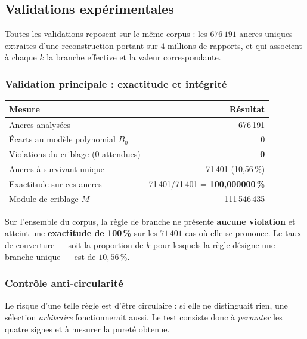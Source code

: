 \documentclass[11pt,a4paper]{article}
\begin{document}
\subsection{Validations expérimentales}

Toutes les validations reposent sur le même corpus : les
$676\,191$ ancres uniques extraites d'une reconstruction portant sur
$4$ millions de rapports, et qui associent à chaque $k$ la branche
effective et la valeur correspondante.

\subsubsection{Validation principale : exactitude et intégrité}

\begin{center}
\small
\begin{tabular}{@{}l r@{}}
\toprule
\rowcolor{spectralgris}
Mesure & Résultat \\
\midrule
Ancres analysées & 676\,191 \\
Écarts au modèle polynomial $B_0$ & 0 \\
Violations du criblage (0 attendues) & \textbf{0} \\
Ancres à survivant unique & 71\,401 \quad (10{,}56\,\%) \\
Exactitude sur ces ancres & 71\,401/71\,401 \;=\; \textbf{100{,}000000\,\%} \\
Module de criblage $M$ & 111\,546\,435 \\
\bottomrule
\end{tabular}
\end{center}

\vspace{0.3cm}
\begin{boiteformule}
Sur l'ensemble du corpus, la règle de branche ne présente
\textbf{aucune violation} et atteint une \textbf{exactitude de
100\,\%} sur les $71\,401$ cas où elle se prononce. Le taux de
couverture --- soit la proportion de $k$ pour lesquels la règle désigne
une branche unique --- est de $10{,}56\,\%$.
\end{boiteformule}

\subsubsection{Contrôle anti-circularité}

Le risque d'une telle règle est d'être circulaire : si elle ne
distinguait rien, une sélection \emph{arbitraire} fonctionnerait aussi.
Le test consiste donc à \emph{permuter} les quatre signes et à mesurer
la pureté obtenue.
\end{document}
